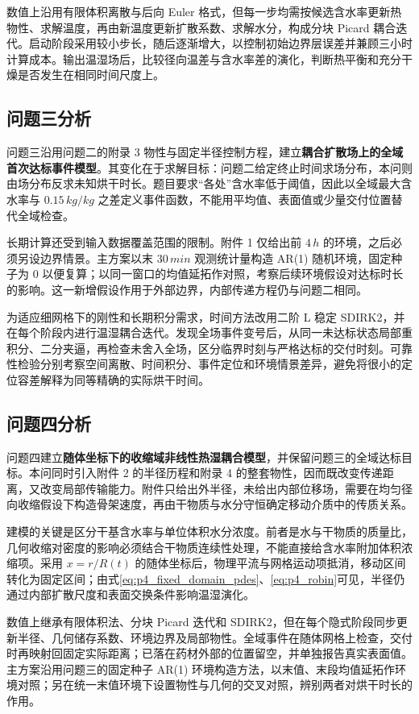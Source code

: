 \documentclass[withoutpreface,bwprint]{cumcmthesis}
\begin{document}
数值上沿用有限体积离散与后向 Euler 格式，但每一步均需按候选含水率更新热物性、求解温度，再由新温度更新扩散系数、求解水分，构成分块 Picard 耦合迭代。启动阶段采用较小步长，随后逐渐增大，以控制初始边界层误差并兼顾三小时计算成本。输出温湿场后，比较径向温差与含水率差的演化，判断热平衡和充分干燥是否发生在相同时间尺度上。

\subsection{问题三分析}

问题三沿用问题二的附录 3 物性与固定半径控制方程，建立\textbf{耦合扩散场上的全域首次达标事件模型}。其变化在于求解目标：问题二给定终止时间求场分布，本问则由场分布反求未知烘干时长。题目要求“各处”含水率低于阈值，因此以全域最大含水率与 $0.15\,\si{kg/kg}$ 之差定义事件函数，不能用平均值、表面值或少量交付位置替代全域检查。

长期计算还受到输入数据覆盖范围的限制。附件 1 仅给出前 $4\,\si{h}$ 的环境，之后必须另设边界情景。主方案以末 $30\,\si{min}$ 观测统计量构造 AR(1) 随机环境，固定种子为 $0$ 以便复算；以同一窗口的均值延拓作对照，考察后续环境假设对达标时长的影响。这一新增假设作用于外部边界，内部传递方程仍与问题二相同。

为适应细网格下的刚性和长期积分需求，时间方法改用二阶 L 稳定 SDIRK2，并在每个阶段内进行温湿耦合迭代。发现全场事件变号后，从同一未达标状态局部重积分、二分夹逼，再检查未舍入全场，区分临界时刻与严格达标的交付时刻。可靠性检验分别考察空间离散、时间积分、事件定位和环境情景差异，避免将很小的定位容差解释为同等精确的实际烘干时间。

\subsection{问题四分析}

问题四建立\textbf{随体坐标下的收缩域非线性热湿耦合模型}，并保留问题三的全域达标目标。本问同时引入附件 2 的半径历程和附录 4 的整套物性，因而既改变传递距离，又改变局部传输能力。附件只给出外半径，未给出内部位移场，需要在均匀径向收缩假设下构造骨架速度，再由干物质与水分守恒确定移动介质中的传质关系。

建模的关键是区分干基含水率与单位体积水分浓度。前者是水与干物质的质量比，几何收缩对密度的影响必须结合干物质连续性处理，不能直接给含水率附加体积浓缩项。采用 $x=r/R(t)$ 的随体坐标后，物理平流与网格运动项抵消，移动区间转化为固定区间；由式\eqref{eq:p4_fixed_domain_pdes}、\eqref{eq:p4_robin}可见，半径仍通过内部扩散尺度和表面交换条件影响温湿演化。

数值上继承有限体积法、分块 Picard 迭代和 SDIRK2，但在每个隐式阶段同步更新半径、几何储存系数、环境边界及局部物性。全域事件在随体网格上检查，交付时再映射回固定实际距离；已落在药材外部的位置留空，并单独报告真实表面值。主方案沿用问题三的固定种子 AR(1) 环境构造方法，以末值、末段均值延拓作环境对照；另在统一末值环境下设置物性与几何的交叉对照，辨别两者对烘干时长的作用。
\end{document}
